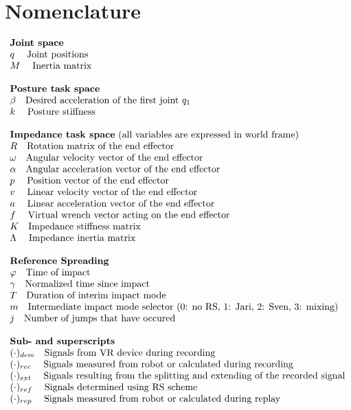 \documentclass[11pt]{report}
\numberwithin{equation}{section}        %
\numberwithin{figure}{section}          %
\numberwithin{table}{section}           %
\begin{document}
\section*{Nomenclature}

$\begin{array}{l}
\text{\textbf{Joint space}}\\
q \;\quad \text{Joint positions}\\
M \;\quad \text{Inertia matrix}\\
\\
\text{\textbf{Posture task space}}\\
\beta \quad \text{Desired acceleration of the first joint } q_1\\
k \;\quad \text{Posture stiffness}\\

\\
\text{\textbf{Impedance task space} (all variables are expressed in world frame)}\\
R \quad \text{Rotation matrix of the end effector}\\
\omega \quad \text{Angular velocity vector of the end effector}\\
\alpha \quad \text{Angular acceleration vector of the end effector}\\
p \;\quad \text{Position vector of the end effector}\\
v \;\quad \text{Linear velocity vector of the end effector}\\
a \;\quad \text{Linear acceleration vector of the end effector}\\
f \;\quad \text{Virtual wrench vector acting on the end effector}\\
K \quad \text{Impedance stiffness matrix} \\
\Lambda \;\quad \text{Impedance inertia matrix} \\
\\

\text{\textbf{Reference Spreading}}\\
\varphi  \quad \text{Time of impact}\\
\gamma  \quad \text{Normalized time since impact}\\
T  \quad \text{Duration of interim impact mode}\\
m \quad \text{Intermediate impact mode selector (0: no RS, 1: Jari, 2: Sven, 3: mixing)}\\
j \quad \text{Number of jumps that have occured}\\\\
\text{\textbf{Sub- and superscripts}}\\
(\cdot)_{dem} \quad \text{Signals from VR device during recording}\\
(\cdot)_{rec} \;\quad \text{Signals measured from robot or calculated during recording}\\
(\cdot)_{ext} \;\quad \text{Signals resulting from the splitting and extending of the recorded signal}\\
(\cdot)_{ref} \;\quad \text{Signals determined using RS scheme}\\
(\cdot)_{rep} \;\quad \text{Signals measured from robot or calculated during replay}\\
\end{array}$
\newpage
\end{document}
